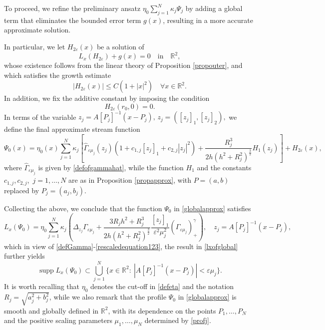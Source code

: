 \documentclass[11pt,reqno,a4paper]{amsart}
\numberwithin{equation}{section}
\newcommand{\R}{\mathbb{R}}
\newcommand{\ve}{\varepsilon}
\begin{document}
To proceed, we refine the preliminary ansatz  $\eta_{0}\sum\limits_{j=1}^{N}\kappa_j\Psi_j$ by adding a global term that eliminates the bounded error term $g(x)$, resulting in a more accurate approximate solution. 

In particular, we let $H_{2\ve}(x)$ be a solution of
\begin{equation*}
L_{x}(H_{2\ve})+g(x)=0 \quad \text{in} \quad \R^2,
\end{equation*}
whose existence follows from the linear theory of Proposition \ref{propouter}, and which satisfies the growth estimate
\begin{equation}\label{boundh2e}
|H_{2\ve}(x)|\leq C\left(1+|x|^2\right)\quad \forall x\in\R^2.
\end{equation}
In addition, we fix the additive constant by imposing the condition
\begin{equation*}
    H_{2\varepsilon}(r_0,0)=0.
\end{equation*}
In terms of the variable $z_j=A[P_j]^{-1}(x-P_j),\,z_j=([z_j]_1,[z_j]_2),$ we define the final approximate stream function 
\begin{equation}\label{globalapprox}
    \Psi_0(x)=\eta_{0}(x)\sum_{j=1}^{N}\kappa_j\left[\widehat{\Gamma}_{\ve\mu_j}(z_j)\left(1+c_{1,j}[z_j]_1+c_{2,j}|z_j|^2\right)+\frac{R_j^3}{2h(h^2+R_j^2)^{\frac 3 2}}H_{1}(z_j)\right] +H_{2\ve}(x),
\end{equation}
where $\widehat\Gamma_{\ve\mu_j}$ is given by \eqref{defofgammahat}, while the function $H_{1}$ and the constants $c_{1,j}$,\,$c_{2,j}$, \,$j=1,\dots,N$ are as in Proposition \ref{propapprox}, with $P=(a,b)$ replaced by $P_j=(a_j,b_j)$. 

Collecting the above, we conclude that the function $\Psi_0$ in \eqref{globalapprox} satisfies 
\begin{equation}\label{lxofglobal}
    L_{x}(\Psi_0)= \eta_0\sum_{j=1}^{N}\kappa_j\left(\Delta_{z_j} \Gamma_{\ve\mu_j}+\frac{3R_jh^2+R_j^3}{2h(h^2+R_j^2)^{\frac 3 2}}\frac{[z_j]_1}{\ve^2\mu_j^2}\left(\Gamma_{\ve\mu_j}\right)^{\gamma}_{+}\right), \quad z_j=A[P_j]^{-1}(x-P_j),
\end{equation}
which in view of \eqref{defGamma}-\eqref{rescaledequation123}, the result in \eqref{lxofglobal} further yields
\begin{equation}\label{Lxsupport}
\operatorname{supp}
L_x(\Psi_0)\subset\bigcup_{j=1}^N \{x\in\mathbb{R}^2:\ |A[P_j]^{-1}(x-P_j)|<\ve\mu_j\}.
\end{equation}
 It is worth recalling that $\eta_0$ denotes the cut-off in \eqref{defeta} and the notation $R_j=\sqrt{a_j^2+b_j^2}$, while we also remark that the profile $\Psi_0$ in \eqref{globalapprox} is smooth and globally defined in $\R^2$, with its dependence on the points $P_1,\dots,P_N$ and the positive scaling parameters $\mu_1,\dots,\mu_N$ determined by \eqref{profj}.
\end{document}
